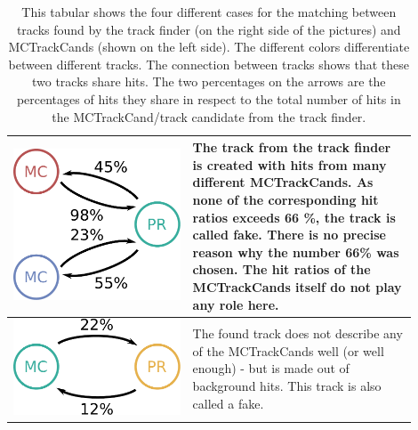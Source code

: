 \begin{table}
\begin{tabular}{m{0.4\linewidth}m{0.5\linewidth}}
    \centering \includegraphics[width=0.8\linewidth]{figures/theory/fom_fake.pdf} & The track from the track finder is created with hits from many different MCTrackCands. As none of the corresponding hit ratios exceeds 66 \%, the track is called fake. There is no precise reason why the number 66\% was chosen. The hit ratios of the MCTrackCands itself do not play any role here. \\  \midrule
    \centering \includegraphics[width=0.8\linewidth]{figures/theory/fom_background.pdf} & The found track does not describe any of the MCTrackCands well (or well enough) - but is made out of background hits. This track is also called a fake. \\ \bottomrule
  \end{tabular}
  \caption[Matching routine for compiling the FOM.]{This tabular shows the four different cases for the matching between tracks found by the track finder (on the right side of the pictures) and MCTrackCands (shown on the left side). The different colors differentiate between different tracks. The connection between tracks shows that these two tracks share hits. The two percentages on the arrows are the percentages of hits they share in respect to the total number of hits in the MCTrackCand/track candidate from the track finder.}
  \label{tab-mc-track-finder}
\end{table}

